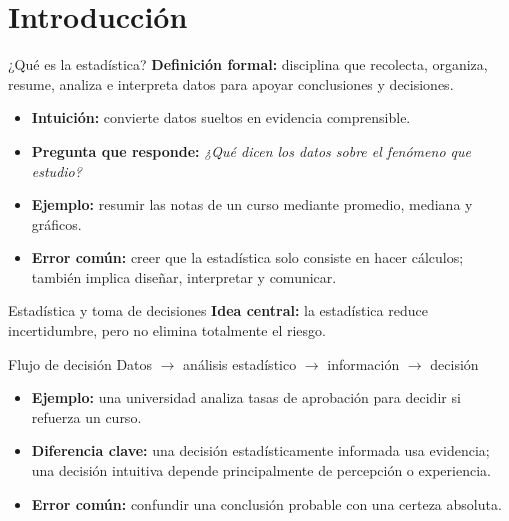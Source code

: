 \documentclass[aspectratio=169,11pt]{beamer}
\newcommand{\pregunta}[1]{\textbf{Pregunta que responde:} \emph{#1}}
\newcommand{\errorcomun}[1]{\textbf{Error común:} #1}
\newcommand{\diferencia}[1]{\textbf{Diferencia clave:} #1}
\begin{document}
\section{Introducción}

\begin{frame}{¿Qué es la estadística?}
\textbf{Definición formal:} disciplina que recolecta, organiza, resume, analiza e interpreta datos para apoyar conclusiones y decisiones.
\vspace{0.4em}
\begin{itemize}
  \item \textbf{Intuición:} convierte datos sueltos en evidencia comprensible.
  \item \pregunta{¿Qué dicen los datos sobre el fenómeno que estudio?}
  \item \textbf{Ejemplo:} resumir las notas de un curso mediante promedio, mediana y gráficos.
  \item \errorcomun{creer que la estadística solo consiste en hacer cálculos; también implica diseñar, interpretar y comunicar.}
\end{itemize}
\end{frame}

\begin{frame}{Estadística y toma de decisiones}
\textbf{Idea central:} la estadística reduce incertidumbre, pero no elimina totalmente el riesgo.
\begin{block}{Flujo de decisión}
Datos $\rightarrow$ análisis estadístico $\rightarrow$ información $\rightarrow$ decisión
\end{block}
\begin{itemize}
  \item \textbf{Ejemplo:} una universidad analiza tasas de aprobación para decidir si refuerza un curso.
  \item \diferencia{una decisión estadísticamente informada usa evidencia; una decisión intuitiva depende principalmente de percepción o experiencia.}
  \item \errorcomun{confundir una conclusión probable con una certeza absoluta.}
\end{itemize}
\end{frame}
\end{document}
